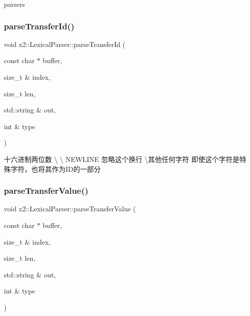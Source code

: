 parsers \mbox{\label{classx2_1_1_lexical_parser_a0cf09764367aa7e6ccf044150bb9d435}} 
\subsubsection{\texorpdfstring{parse\+Transfer\+Id()}{parseTransferId()}}
{\footnotesize\ttfamily void x2\+::\+Lexical\+Parser\+::parse\+Transfer\+Id (\begin{DoxyParamCaption}\item[{const char $\ast$}]{buffer,  }\item[{size\+\_\+t \&}]{index,  }\item[{size\+\_\+t}]{len,  }\item[{std\+::string \&}]{out,  }\item[{int \&}]{type }\end{DoxyParamCaption})\hspace{0.3cm}{\ttfamily [delete]}}

十六进制两位数 \textbackslash{} \textbackslash{} N\+E\+W\+L\+I\+NE 忽略这个换行 \textbackslash{}其他任何字符 即使这个字符是特殊字符，也将其作为\+I\+D的一部分 \mbox{\label{classx2_1_1_lexical_parser_a719a5e77295d26d71de8381757fc1ab5}} 
\subsubsection{\texorpdfstring{parse\+Transfer\+Value()}{parseTransferValue()}}
{\footnotesize\ttfamily void x2\+::\+Lexical\+Parser\+::parse\+Transfer\+Value (\begin{DoxyParamCaption}\item[{const char $\ast$}]{buffer,  }\item[{size\+\_\+t \&}]{index,  }\item[{size\+\_\+t}]{len,  }\item[{std\+::string \&}]{out,  }\item[{int \&}]{type }\end{DoxyParamCaption})\hspace{0.3cm}{\ttfamily [delete]}}

